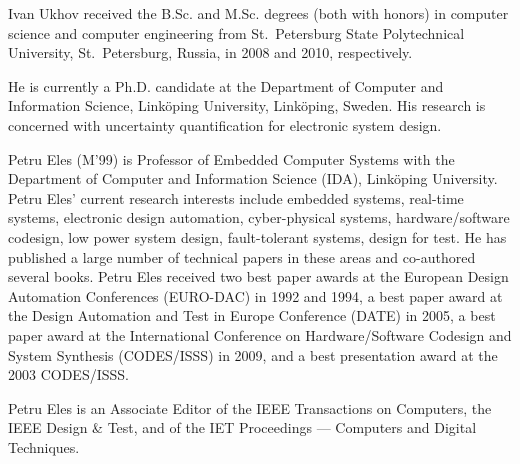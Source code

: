 \begin{IEEEbiographynophoto}{Ivan Ukhov}
received the B.Sc. and M.Sc. degrees (both with honors) in computer science and computer engineering from St.~Petersburg State Polytechnical University, St.~Petersburg, Russia, in 2008 and 2010, respectively.

He is currently a Ph.D. candidate at the Department of Computer and Information Science, Link\"{o}ping University, Link\"{o}ping, Sweden.
His research is concerned with uncertainty quantification for electronic system design.
\end{IEEEbiographynophoto}

\begin{IEEEbiographynophoto}{Petru Eles}
(M'99) is Professor of Embedded Computer Systems with the Department of Computer and Information Science (IDA), Link\"{o}ping University.
Petru Eles' current research interests include embedded systems, real-time systems, electronic design automation, cyber-physical systems, hardware/software codesign, low power system design, fault-tolerant systems, design for test.
He has published a large number of technical papers in these areas and co-authored several books.
Petru Eles received two best paper awards at the European Design Automation Conferences (EURO-DAC) in 1992 and 1994, a best paper award at the Design Automation and Test in Europe Conference (DATE) in 2005, a best paper award at the International Conference on Hardware/Software Codesign and System Synthesis (CODES/ISSS) in 2009, and a best presentation award at the 2003 CODES/ISSS.

Petru Eles is an Associate Editor of the IEEE Transactions on Computers, the IEEE Design \& Test, and of the IET Proceedings --- Computers and Digital Techniques.
\end{IEEEbiographynophoto}

